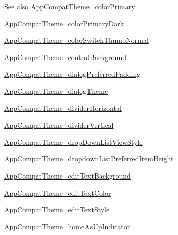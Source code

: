 \begin{DoxySeeAlso}{See also}
\hyperlink{classandroid_1_1support_1_1v7_1_1cardview_1_1R_1_1styleable_a1ded3a190d020f33c8807adef684cbee}{App\+Compat\+Theme\+\_\+color\+Primary} 

\hyperlink{classandroid_1_1support_1_1v7_1_1cardview_1_1R_1_1styleable_a43a0f2dbaa8e5b83115079105d180ee5}{App\+Compat\+Theme\+\_\+color\+Primary\+Dark} 

\hyperlink{classandroid_1_1support_1_1v7_1_1cardview_1_1R_1_1styleable_a992cb4f1559d830c77adbb17b8d9d0b6}{App\+Compat\+Theme\+\_\+color\+Switch\+Thumb\+Normal} 

\hyperlink{classandroid_1_1support_1_1v7_1_1cardview_1_1R_1_1styleable_aded076ba098cace6d5af80e46448b628}{App\+Compat\+Theme\+\_\+control\+Background} 

\hyperlink{classandroid_1_1support_1_1v7_1_1cardview_1_1R_1_1styleable_ae8501eb855f89c1202f5514c8347c99f}{App\+Compat\+Theme\+\_\+dialog\+Preferred\+Padding} 

\hyperlink{classandroid_1_1support_1_1v7_1_1cardview_1_1R_1_1styleable_a75ef082c5a516f8dbdbfe7ada1a403ec}{App\+Compat\+Theme\+\_\+dialog\+Theme} 

\hyperlink{classandroid_1_1support_1_1v7_1_1cardview_1_1R_1_1styleable_ab43c9135bab4d1f11e5da417725ca828}{App\+Compat\+Theme\+\_\+divider\+Horizontal} 

\hyperlink{classandroid_1_1support_1_1v7_1_1cardview_1_1R_1_1styleable_a0c1aaaa486728e1316ec4549d70827f9}{App\+Compat\+Theme\+\_\+divider\+Vertical} 

\hyperlink{classandroid_1_1support_1_1v7_1_1cardview_1_1R_1_1styleable_a9d95b8b96fc0c33fe2ccdbca4bb4c766}{App\+Compat\+Theme\+\_\+drop\+Down\+List\+View\+Style} 

\hyperlink{classandroid_1_1support_1_1v7_1_1cardview_1_1R_1_1styleable_afaa8a297c466030001f56355b8189813}{App\+Compat\+Theme\+\_\+dropdown\+List\+Preferred\+Item\+Height} 

\hyperlink{classandroid_1_1support_1_1v7_1_1cardview_1_1R_1_1styleable_a4aa486808b398010c0add74652864333}{App\+Compat\+Theme\+\_\+edit\+Text\+Background} 

\hyperlink{classandroid_1_1support_1_1v7_1_1cardview_1_1R_1_1styleable_ac460822fecf040d46fdef2df0935686e}{App\+Compat\+Theme\+\_\+edit\+Text\+Color} 

\hyperlink{classandroid_1_1support_1_1v7_1_1cardview_1_1R_1_1styleable_aa67cb5a7db3afa80cebeb9fad0404dff}{App\+Compat\+Theme\+\_\+edit\+Text\+Style} 

\hyperlink{classandroid_1_1support_1_1v7_1_1cardview_1_1R_1_1styleable_a2e70ceeae7e1d05bbc4fc942d0a8f7c5}{App\+Compat\+Theme\+\_\+home\+As\+Up\+Indicator} 


\end{DoxySeeAlso}
